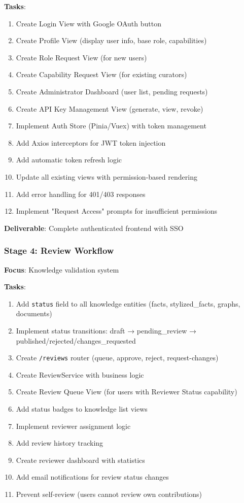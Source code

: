 \documentclass[12pt,a4paper]{article}
\begin{document}
\textbf{Tasks}:
\begin{enumerate}
    \item Create Login View with Google OAuth button
    \item Create Profile View (display user info, base role, capabilities)
    \item Create Role Request View (for new users)
    \item Create Capability Request View (for existing curators)
    \item Create Administrator Dashboard (user list, pending requests)
    \item Create API Key Management View (generate, view, revoke)
    \item Implement Auth Store (Pinia/Vuex) with token management
    \item Add Axios interceptors for JWT token injection
    \item Add automatic token refresh logic
    \item Update all existing views with permission-based rendering
    \item Add error handling for 401/403 responses
    \item Implement "Request Access" prompts for insufficient permissions
\end{enumerate}

\textbf{Deliverable}: Complete authenticated frontend with SSO

\subsubsection{Stage 4: Review Workflow}
\textbf{Focus}: Knowledge validation system

\textbf{Tasks}:
\begin{enumerate}
    \item Add \texttt{status} field to all knowledge entities (facts, stylized\_facts, graphs, documents)
    \item Implement status transitions: draft → pending\_review → published/rejected/changes\_requested
    \item Create \texttt{/reviews} router (queue, approve, reject, request-changes)
    \item Create ReviewService with business logic
    \item Create Review Queue View (for users with Reviewer Status capability)
    \item Add status badges to knowledge list views
    \item Implement reviewer assignment logic
    \item Add review history tracking
    \item Create reviewer dashboard with statistics
    \item Add email notifications for review status changes
    \item Prevent self-review (users cannot review own contributions)
\end{enumerate}
\end{document}

